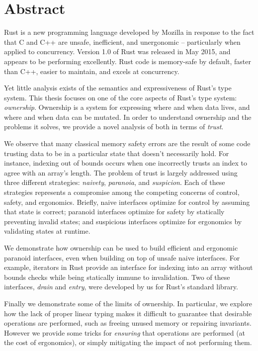 {}
\begingroup
\let\clearpage\relax
\let\cleardoublepage\relax
\let\cleardoublepage\relax

\chapter*{Abstract}
Rust is a new programming language developed by Mozilla in response to the fact
that C and C++ are unsafe, inefficient, and unergonomic -- particularly when
applied to concurrency. Version 1.0 of Rust was released in May 2015, and appears
to be performing excellently. Rust code is memory-safe
by default, faster than C++, easier to maintain, and excels at concurrency.

Yet little analysis exists of the semantics and expressiveness of Rust's type
system. This thesis focuses on one of the core aspects of Rust's type system:
\emph{ownership}. Ownership is a system for expressing where and when data lives, and
where and when data can be mutated. In order to understand ownership and the
problems it solves, we provide a novel analysis of both in terms of \emph{trust}.

We observe that many classical memory safety errors are the result of some
code trusting data to be in a particular state that doesn't necessarily hold.
For instance, indexing out of bounds occurs when one incorrectly trusts an
index to agree with an array's length. The problem of trust is largely addressed using three
different strategies: \emph{naivety}, \emph{paranoia}, and \emph{suspicion}. Each
of these strategies represents a compromise among the competing concerns of control, safety, and
ergonomics. Briefly, naive interfaces optimize for control by assuming that
state is correct; paranoid interfaces optimize for safety by statically preventing
invalid states; and suspicious interfaces optimize for ergonomics by validating
states at runtime.

We demonstrate how ownership can be used to build efficient and ergonomic
paranoid interfaces, even when building on top of unsafe naive interfaces. For example,
iterators in Rust provide an interface for indexing into an array
without bounds checks while being statically immune to invalidation.
Two of these interfaces, \emph{drain} and \emph{entry}, were developed by us for Rust's
standard library.

Finally we demonstrate some of the limits of ownership. In particular, we
explore how the lack of proper linear typing makes it difficult to guarantee
that desirable operations are performed, such as freeing unused memory or
repairing invariants. However we provide some tricks for \emph{ensuring} that operations
are performed (at the cost of ergonomics), or simply mitigating the impact of not
performing them.

\endgroup

\vfill
